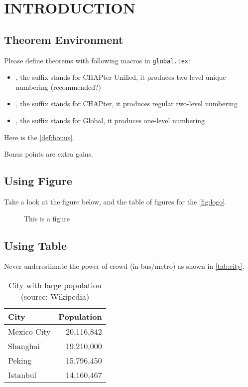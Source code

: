 \chapter{INTRODUCTION}

\section{Theorem Environment}
Please define theorems with following macros in \texttt{global.tex}:
\begin{itemize}
\item {}, the suffix stands for CHAPter Unified,
it produces two-level unique numbering (recommended?)
\item {}, the suffix stands for CHAPter,
it produces regular two-level numbering
\item {}, the suffix stands for Global,
it produces one-level numbering
\end{itemize}

Here is the \autoref{def:bonus}.
\begin{definition}\label{def:bonus}
  Bonus points are extra gains.
\end{definition}

\section{Using Figure}
Take a look at the figure below, and the table of figures for the \autoref{fig:logo}.

\begin{figure}[H]
  \quad
  \caption[Demo]{This is a figure\label{fig:logo}}
\end{figure}

\section{Using Table}
Never underestimate the power of crowd (in bus/metro) as shown in \autoref{tab:city}.
\begin{table}[htb]
  \caption[City population]{City with large population (source: Wikipedia)\label{tab:city}}
  \begin{tabular}{lr}
    \toprule
    City & Population \\
    \midrule
    Mexico City & 20,116,842\\
    Shanghai & 19,210,000\\
    Peking & 15,796,450\\
    Istanbul & 14,160,467\\
    \bottomrule
  \end{tabular}
\end{table}

